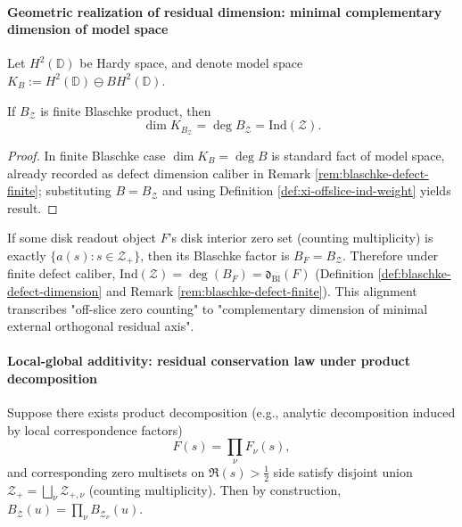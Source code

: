 \paragraph{Geometric realization of residual dimension: minimal complementary dimension of model space}
Let \(H^2(\mathbb{D})\) be Hardy space, and denote model space \(K_B:=H^2(\mathbb{D})\ominus BH^2(\mathbb{D})\).

\begin{proposition}\label{prop:xi-offslice-model-space-dimension}
If \(B_{\mathcal Z}\) is finite Blaschke product, then
\[
\dim K_{B_{\mathcal Z}}=\deg B_{\mathcal Z}=\mathrm{Ind}(\mathcal Z).
\]
\end{proposition}

\begin{proof}
In finite Blaschke case \(\dim K_B=\deg B\) is standard fact of model space, already recorded as defect dimension caliber in Remark \ref{rem:blaschke-defect-finite}; substituting \(B=B_{\mathcal Z}\) and using Definition \ref{def:xi-offslice-ind-weight} yields result.
\end{proof}

\begin{remark}\label{rem:xi-offslice-ind-equals-dbl}
If some disk readout object \(F\)'s disk interior zero set (counting multiplicity) is exactly \(\{a(s):s\in\mathcal Z_{+}\}\), then its Blaschke factor is \(B_F=B_{\mathcal Z}\).
Therefore under finite defect caliber,
\(
\mathrm{Ind}(\mathcal Z)=\deg(B_F)=\mathfrak d_{\mathrm{Bl}}(F)
\)
(Definition \ref{def:blaschke-defect-dimension} and Remark \ref{rem:blaschke-defect-finite}).
This alignment transcribes "off-slice zero counting" to "complementary dimension of minimal external orthogonal residual axis".
\end{remark}

\paragraph{Local-global additivity: residual conservation law under product decomposition}
Suppose there exists product decomposition (e.g., analytic decomposition induced by local correspondence factors)
\[
F(s)=\prod_{\nu}F_{\nu}(s),
\]
and corresponding zero multisets on \(\Re(s)>\tfrac12\) side satisfy disjoint union
\(
\mathcal Z_{+}=\bigsqcup_{\nu}\mathcal Z_{+,\nu}
\)
(counting multiplicity).
Then by construction, \(B_{\mathcal Z}(u)=\prod_{\nu}B_{\mathcal Z_\nu}(u)\).

